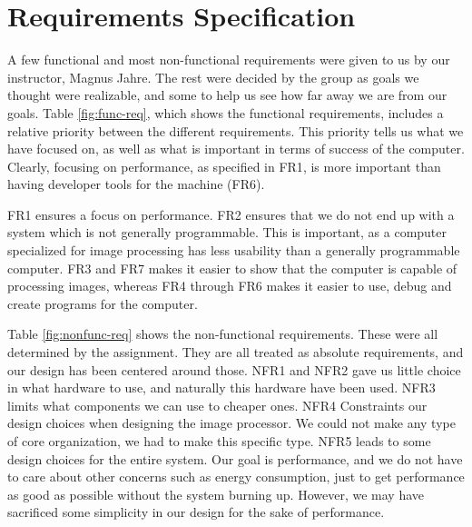 \section{Requirements Specification}

 A few functional
and most non-functional requirements were given to us by our instructor, Magnus
Jahre. The rest were decided by the group as goals we thought were realizable, and
some to help us see how far away we are from our goals. Table
\ref{fig:func-req}, which shows the functional requirements, includes a relative
priority between the different requirements.  This priority tells us what we
have focused on, as well as what is important in terms of success of the
computer. Clearly, focusing on performance, as specified in {\sc FR1}, is more
important than having developer tools for the machine ({\sc FR6}).

{\sc FR1} ensures a focus on performance. {\sc FR2} ensures that we do not end
up with a system which is not generally programmable. This is important, as a
computer specialized for image processing has less usability than a generally
programmable computer. {\sc FR3} and {\sc FR7} makes it easier to show that the
computer is capable of processing images, whereas {\sc FR4} through {\sc FR6} makes it
easier to use, debug and create programs for the computer.



Table \ref{fig:nonfunc-req} shows the non-functional requirements. These were
all determined by the assignment. They are all treated as absolute requirements,
and our design has been centered around those. {\sc NFR1} and {\sc NFR2} gave us
little choice in what hardware to use, and naturally this hardware have been used. {\sc
  NFR3} limits what components we can use to cheaper ones. {\sc NFR4} Constraints our
design choices when designing the image processor. We could not make any type of core
organization, we had to make this specific type. {\sc NFR5} leads to some
design choices for the entire system. Our goal is performance, and we do not
have to care about other concerns such as energy consumption, just to
get performance as good as possible without the system
burning up. However, we may have sacrificed some simplicity in our design for
the sake of performance.
